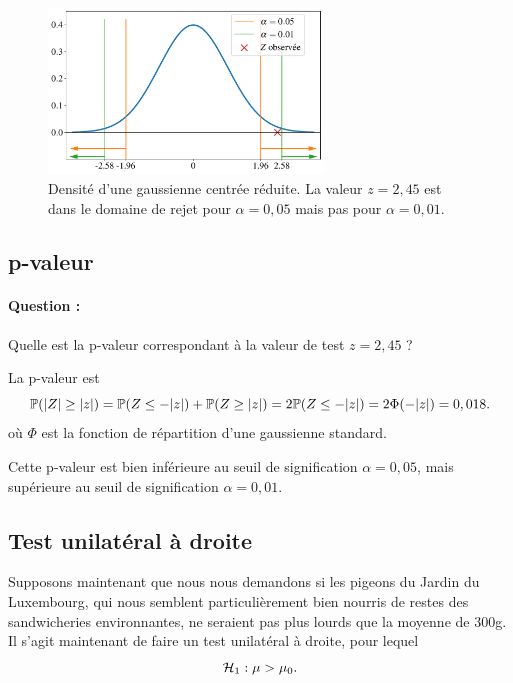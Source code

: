 \begin{figure}[h]
  \centering
  \includegraphics[width=0.65\textwidth]{figures/tests/z_pigeons}
  \caption{Densité d'une gaussienne centrée réduite. La valeur $z=2,45$ est
    dans le domaine de rejet pour $\alpha = 0,05$ mais pas pour
    $\alpha = 0,01$.}
  \label{fig:z_pigeons}
\end{figure}

\subsection{p-valeur}
\paragraph{Question :} Quelle est la p-valeur correspondant à la valeur de test
$z=2,45$ ?
\begin{answer}
  La p-valeur est
  \[
    \mathbb{P}(\lvert Z\rvert \geq \lvert z\rvert) = \mathbb{P}(Z \leq -\lvert z\rvert) + \mathbb{P}(Z \geq \lvert z\rvert) = 2
    \mathbb{P}(Z \leq -\lvert z\rvert) = 2 \Phi(-\lvert z\rvert) = 0,018.
  \]
  où $\Phi$ est la fonction de répartition d'une gaussienne standard.

  Cette p-valeur est bien inférieure au seuil de signification $\alpha = 0,05$,
  mais supérieure au seuil de signification $\alpha = 0,01$.
\end{answer}

\subsection{Test unilatéral à droite}
Supposons maintenant que nous nous demandons si les pigeons du Jardin du
Luxembourg, qui nous semblent particulièrement bien nourris de restes des
sandwicheries environnantes, ne seraient pas plus lourds que la moyenne de
300g. Il s'agit maintenant de faire un test unilatéral à droite, pour lequel
\[
  \mathcal{H}_1 : \mu > \mu_0.
\]

